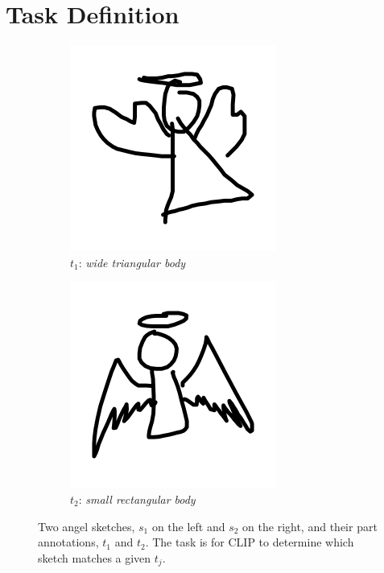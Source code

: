 
     

\section{Task Definition} \label{modeling.task.def}
\begin{figure}[!htb]
\begin{subfigure}{0.5\textwidth}
    \centering
    \includegraphics[width=0.5\linewidth]{modeling/angel340.png}
    \caption{$t_1$: \textit{wide triangular body}}
    \label{modeling.task.sketches.1}  
\end{subfigure}
\begin{subfigure}{0.5\textwidth}
    \centering
    \includegraphics[width=0.5\linewidth]{modeling/angel389.png}   
    \caption{$t_2$: \textit{small rectangular body}}
    \label{modeling.task.sketches.2}  
\end{subfigure}
\caption{Two angel sketches, $s_1$ on the left and $s_2$ on the right, and their part annotations, $t_1$ and $t_2$. The task is for CLIP to determine which sketch matches a given $t_j$.}
\label{modeling.task.sketches}
\end{figure}


